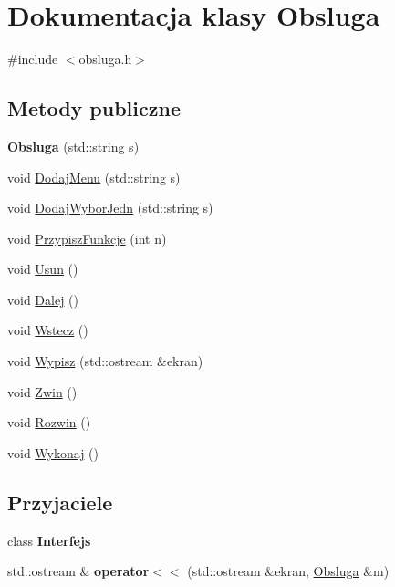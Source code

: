 \hypertarget{classObsluga}{\section{Dokumentacja klasy Obsluga}
\label{classObsluga}
}


{\ttfamily \#include $<$obsluga.\-h$>$}

\subsection*{Metody publiczne}
\begin{DoxyCompactItemize}
\item 
\hypertarget{classObsluga_a5d6c171d6a9b4f6f9caa444b09fcb460}{{\bfseries Obsluga} (std\-::string s)}\label{classObsluga_a5d6c171d6a9b4f6f9caa444b09fcb460}

\item 
void \hyperlink{classObsluga_aaf91f84ea408e2ee478009ff28d0719c}{Dodaj\-Menu} (std\-::string s)
\item 
void \hyperlink{classObsluga_a141f1c29476498fecf4c74983c60f107}{Dodaj\-Wybor\-Jedn} (std\-::string s)
\item 
void \hyperlink{classObsluga_a79ac7b11058423a625c971688d012a5c}{Przypisz\-Funkcje} (int n)
\item 
void \hyperlink{classObsluga_af4498067cfb12688c9b395a9ec58cd4a}{Usun} ()
\item 
void \hyperlink{classObsluga_a5567d2685b8ca89fe1d6593f0826a653}{Dalej} ()
\item 
void \hyperlink{classObsluga_a36f1c6f4841b40c6d44fd1fc3fd2449b}{Wstecz} ()
\item 
void \hyperlink{classObsluga_a5c3d436c5b2daa909d9edf6a4e288818}{Wypisz} (std\-::ostream \&ekran)
\item 
void \hyperlink{classObsluga_add7a400f68afe5e0c049855ed428fd3a}{Zwin} ()
\item 
void \hyperlink{classObsluga_a3b625d79bab85d07a4da24bc105e312d}{Rozwin} ()
\item 
void \hyperlink{classObsluga_aed45a6c9be358bcbce191617e6e04be7}{Wykonaj} ()
\end{DoxyCompactItemize}
\subsection*{Przyjaciele}
\begin{DoxyCompactItemize}
\item 
\hypertarget{classObsluga_a29bee9078fbc123e023d6d8cb376928d}{class {\bfseries Interfejs}}\label{classObsluga_a29bee9078fbc123e023d6d8cb376928d}

\item 
\hypertarget{classObsluga_aeac69cdc1820ab17cd012468f3f0a85c}{std\-::ostream \& {\bfseries operator$<$$<$} (std\-::ostream \&ekran, \hyperlink{classObsluga}{Obsluga} \&m)}\label{classObsluga_aeac69cdc1820ab17cd012468f3f0a85c}

\end{DoxyCompactItemize}


